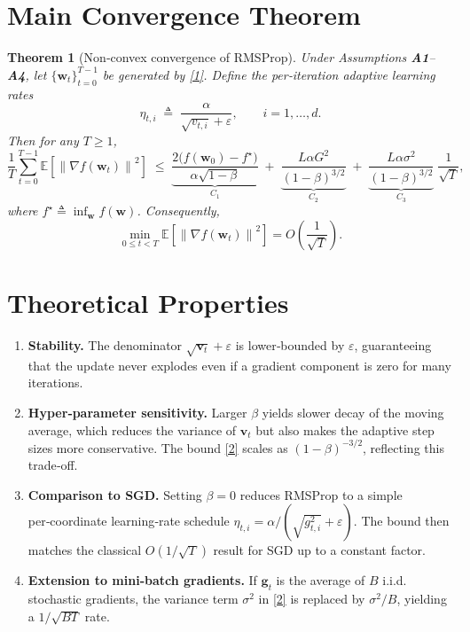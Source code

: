 \documentclass{article}
\newtheorem{theorem}{Theorem}
\newcommand{\E}{\mathbb{E}}
\newcommand{\norm}[1]{\left\|#1\right\|}
\begin{document}
\section*{Main Convergence Theorem}
\begin{theorem}[Non‑convex convergence of RMSProp]\label{thm:main}
Under Assumptions \textbf{A1}–\textbf{A4}, let $\{\bm w_{t}\}_{t=0}^{T-1}$ be generated by \eqref{1}. Define the per‑iteration adaptive learning rates
\[
\eta_{t,i}\;\triangleq\;\frac{\alpha}{\sqrt{v_{t,i}}+\varepsilon},\qquad i=1,\dots,d.
\]
Then for any $T\ge 1$,
\[
\frac{1}{T}\sum_{t=0}^{T-1}\E\!\left[\norm{\nabla f(\bm w_{t})}^{2}\right]
\;\le\;
\underbrace{\frac{2\big(f(\bm w_{0})-f^{\star}\big)}{\alpha\sqrt{1-\beta}}}_{C_{1}}
\;+\;
\underbrace{\frac{L\alpha G^{2}}{(1-\beta)^{3/2}}}_{C_{2}}
\;+\;
\underbrace{\frac{L\alpha\sigma^{2}}{(1-\beta)^{3/2}}}_{C_{3}}\;\frac{1}{\sqrt{T}},
\tag{2}
\]
where $f^{\star}\triangleq\inf_{\bm w}f(\bm w)$. Consequently,
\[
\min_{0\le t<T}\E\!\left[\norm{\nabla f(\bm w_{t})}^{2}\right]
=O\!\left(\frac{1}{\sqrt{T}}\right).
\]
\end{theorem}

\section*{Theoretical Properties}
\begin{enumerate}[label=\textbf{P\arabic*:}, leftmargin=*]
\item \textbf{Stability.} The denominator $\sqrt{\bm v_{t}}+\varepsilon$ is lower‑bounded by $\varepsilon$, guaranteeing that the update never explodes even if a gradient component is zero for many iterations.
\item \textbf{Hyper‑parameter sensitivity.} Larger $\beta$ yields slower decay of the moving average, which reduces the variance of $\bm v_{t}$ but also makes the adaptive step sizes more conservative. The bound \eqref{2} scales as $(1-\beta)^{-3/2}$, reflecting this trade‑off.
\item \textbf{Comparison to SGD.} Setting $\beta=0$ reduces RMSProp to a simple per‑coordinate learning‑rate schedule $\eta_{t,i}= \alpha/(\sqrt{g_{t,i}^{2}}+\varepsilon)$. The bound then matches the classical $O(1/\sqrt{T})$ result for SGD up to a constant factor.
\item \textbf{Extension to mini‑batch gradients.} If $\bm g_{t}$ is the average of $B$ i.i.d. stochastic gradients, the variance term $\sigma^{2}$ in \eqref{2} is replaced by $\sigma^{2}/B$, yielding a $1/\sqrt{BT}$ rate.
\end{enumerate}
\end{document}
